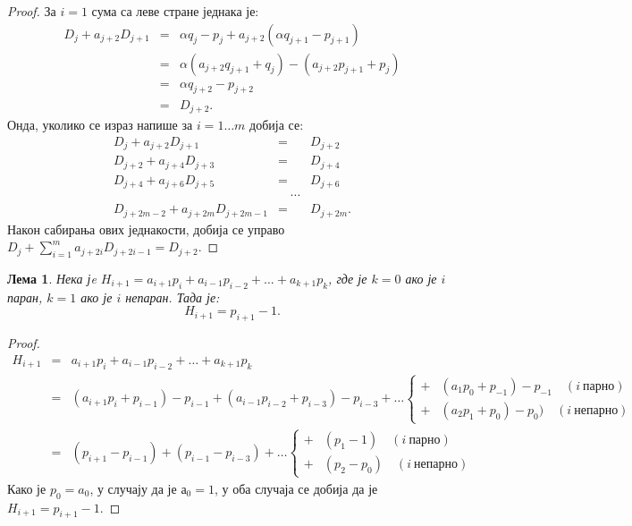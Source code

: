 \documentclass[a4paper]{article}
\newtheorem{lemma}{Лема}
\begin{document}
\begin{proof}
    За $ i = 1 $ сума са леве стране једнака је:
	\begin{eqnarray*}
		D_{j} + a_{j+2}D_{j+1} &=& \alpha q_{j} - p_{j} + a_{j+2}(\alpha q_{j+1} - p_{j+1})\\
							   &=& \alpha (a_{j+2}q_{j+1} + q_{j}) - (a_{j+2}p_{j+1} + p_{j})\\
							   &=& \alpha q_{j+2} - p_{j+2} \\
							   &=& D_{j+2}.
	\end{eqnarray*}
	Онда, уколико се израз напише за $ i= 1 \ldots m $ добија се:
	\begin{eqnarray*}
		D_{j} + a_{j+2}D_{j+1} &=& D_{j+2}\\
		D_{j+2} + a_{j+4}D_{j+3} &=& D_{j+4}\\
		D_{j+4} + a_{j+6}D_{j+5} &=& D_{j+6}\\
		&\quad\cdots& \\
		D_{j+2m-2} + a_{j+2m}D_{j+2m-1} &=& D_{j+2m}.		
	\end{eqnarray*}
	Након сабирања ових једнакости, добија се управо $ D_{j} + \sum_{i=1}^{m} a_{j+2i}D_{j+2i-1} = D_{j+2} $.
\end{proof}

\begin{lemma}
	\label{lemma:par_nepar}
	Нека јe $ H_{i+1} = a_{i+1}p_{i} + a_{i-1}p_{i-2} + \ldots + a_{k+1}p_{k} $, где је $ k = 0 $ ако је $ i $ паран, $ k = 1 $ ако је $ i $ непаран. Тада је: 
		\begin{displaymath}
			H_{i+1} = p_{i+1} - 1.
		\end{displaymath}
\end{lemma}

\begin{proof}
	\begin{eqnarray*}
		H_{i+1} &=& a_{i+1}p_{i} + a_{i-1}p_{i-2} + \ldots + a_{k+1}p_{k}\\
				&=& (a_{i+1}p_{i} + p_{i-1}) - p_{i-1} + (a_{i-1}p_{i-2} + p_{i-3}) - p_{i-3} + \ldots \begin{cases}
					+ & (a_{1}p_{0} + p_{-1}) - p_{-1}\quad (i\ \text{парно})\\
					+ & (a_{2}p_{1} + p_{0}) - p_{0})\quad (i\ \text{непарно})
				\end{cases}\\
				&=& (p_{i+1} - p_{i-1}) + (p_{i-1} - p_{i-3}) + \ldots \begin{cases}
					+ & (p_{1} - 1)\quad (i\ \text{парно})\\
					+ & (p_{2} - p_{0})\quad (i\ \text{непарно})
				\end{cases}
	\end{eqnarray*}
	Како је $ p_{0} = a_{0} $, у случају да је $ а_{0} = 1 $, у оба случаја се добија да је $ H_{i+1} = p_{i+1} - 1 $.
\end{proof}
\end{document}
